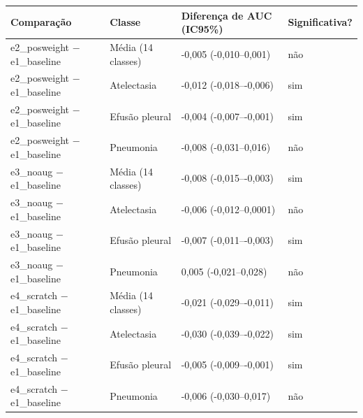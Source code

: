 \begin{tabular}{llll}
\toprule
Comparação & Classe & Diferença de AUC (IC95\%) & Significativa? \\
\midrule
e2\_posweight − e1\_baseline & Média (14 classes) & -0,005 (-0,010–0,001) & não \\
e2\_posweight − e1\_baseline & Atelectasia & -0,012 (-0,018–-0,006) & sim \\
e2\_posweight − e1\_baseline & Efusão pleural & -0,004 (-0,007–-0,001) & sim \\
e2\_posweight − e1\_baseline & Pneumonia & -0,008 (-0,031–0,016) & não \\
e3\_noaug − e1\_baseline & Média (14 classes) & -0,008 (-0,015–-0,003) & sim \\
e3\_noaug − e1\_baseline & Atelectasia & -0,006 (-0,012–0,0001) & não \\
e3\_noaug − e1\_baseline & Efusão pleural & -0,007 (-0,011–-0,003) & sim \\
e3\_noaug − e1\_baseline & Pneumonia & 0,005 (-0,021–0,028) & não \\
e4\_scratch − e1\_baseline & Média (14 classes) & -0,021 (-0,029–-0,011) & sim \\
e4\_scratch − e1\_baseline & Atelectasia & -0,030 (-0,039–-0,022) & sim \\
e4\_scratch − e1\_baseline & Efusão pleural & -0,005 (-0,009–-0,001) & sim \\
e4\_scratch − e1\_baseline & Pneumonia & -0,006 (-0,030–0,017) & não \\
\bottomrule
\end{tabular}
